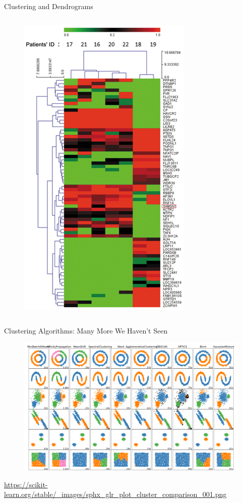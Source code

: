 \documentclass[aspectratio=169]{../latex_main/tntbeamer}  %
\begin{document}
\begin{frame}{Clustering and Dendrograms}
\begin{columns}
	        
	        \begin{column}{.3\textwidth}
	                \begin{figure}
	                    \centering
	                    \includegraphics[scale=.6]{Bild53}
	                \end{figure}
	        \end{column}
	    \end{columns}
	\end{frame}
	
	\begin{frame}{Clustering Algorithms: Many More We Haven’t Seen}
	    \begin{figure}
	        \centering
	        \includegraphics[scale=.5]{Bild54}
	    \end{figure}
	    \url{https://scikit-learn.org/stable/_images/sphx_glr_plot_cluster_comparison_001.png}
	\end{frame}
\end{document}
